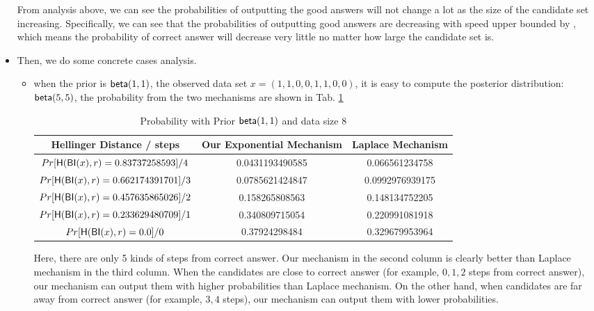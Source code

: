 \documentclass[sigconf, anonymous]{acmart}
\begin{document}
\begin{itemize}
	From analysis above, we can see the probabilities of outputting the good answers will not change a lot as the size of the candidate set increasing. Specifically, we can see that the probabilities of outputting good answers are decreasing with speed upper bounded by , which means the probability of correct answer will decrease very little no matter how large the candidate set is. 

	\item Then, we do some concrete cases analysis.

	\begin{itemize}

		\item when the prior is $\mathsf{beta}(1,1)$, the observed data set $x = (1,1,0,0,1,1,0,0)$, it is easy to compute the posterior distribution: $\mathsf{beta}(5,5)$, the probability from the two mechanisms are shown in Tab. \ref{tab_8} 

		\begin{center}
		\begin{table}
		 \begin{tabular}{c | c | c} 
		 \hline
		 Hellinger Distance / steps & Our Exponential Mechanism & Laplace Mechanism  \\
		 \hline\hline
		 $Pr[\mathsf{H}(\mathsf{BI}(x), r) = 0.83737258593] / 4		$ & 0.0431193490585 & 0.066561234758\\ 
		 \hline
		 $Pr[\mathsf{H}(\mathsf{BI}(x), r) = 0.662174391701 ] / 3	$ & 0.0785621424847 & 0.0992976939175  \\
		 \hline
		 $Pr[\mathsf{H}(\mathsf{BI}(x), r) = 0.457635865026 ] / 2	$ & 0.158265808563 & 0.148134752205  \\
		 \hline
		 $Pr[\mathsf{H}(\mathsf{BI}(x), r) = 0.233629480709 ] / 1	$ & 0.340809715054 & 0.220991081918  \\
		 \hline
		 $Pr[\mathsf{H}(\mathsf{BI}(x), r) = 0.0 ] / 0 				$ & 0.37924298484 & 0.329679953964 \\
		 \hline
		\end{tabular}
		\caption{Probability with Prior $\mathsf{beta}(1,1)$ and data size $8$}
		\label{tab_8}
		\end{table}
		\end{center}

		Here, there are only 5 kinds of steps from correct answer. Our mechanism in the second column is clearly better than Laplace mechanism in the third column. When the candidates are close to correct answer (for example, $0, 1, 2$ steps from correct answer), our mechanism can output them with higher probabilities than Laplace mechanism. On the other hand, when candidates are far away from correct answer (for example, $3, 4$ steps), our mechanism can output them with lower probabilities.


\end{itemize}
\end{itemize}
\end{document}
